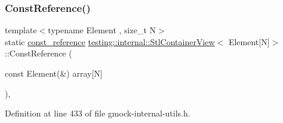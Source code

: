 \subsubsection{\texorpdfstring{Const\+Reference()}{ConstReference()}}
{\footnotesize\ttfamily template$<$typename Element , size\+\_\+t N$>$ \\
static \hyperlink{classtesting_1_1internal_1_1StlContainerView_3_01Element[N]_4_a481e6ab99316939484fad9c561af5e28}{const\+\_\+reference} \hyperlink{classtesting_1_1internal_1_1StlContainerView}{testing\+::internal\+::\+Stl\+Container\+View}$<$ Element\mbox{[}N\mbox{]}$>$\+::Const\+Reference (\begin{DoxyParamCaption}\item[{const Element(\&)}]{array\mbox{[}\+N\mbox{]} }\end{DoxyParamCaption})\hspace{0.3cm}{\ttfamily [inline]}, {\ttfamily [static]}}



Definition at line 433 of file gmock-\/internal-\/utils.\+h.


